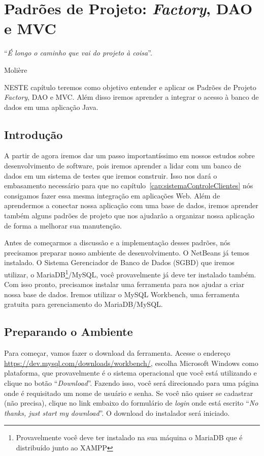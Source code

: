 \chapter{Padrões de Projeto: \textit{Factory}, DAO e MVC}\label{cap:padroesDeProjeto}
\epigraph{``\textit{É longo o caminho que vai do projeto à coisa}''.}{Molière}

\lettrine[lines=4, lhang=0.1, lraise=0, loversize=0.2, findent=0.1em]{\textcolor{corTema}{N}}{ESTE} capítulo teremos como objetivo entender e aplicar os Padrões de Projeto \textit{Factory}, DAO e MVC. Além disso iremos aprender a integrar o acesso à banco de dados em uma aplicação Java.


\section{Introdução}

A partir de agora iremos dar um passo importantíssimo em nossos estudos sobre desenvolvimento de software, pois iremos aprender a lidar com um banco de dados em um sistema de testes que iremos construir. Isso nos dará o embasamento necessário para que no capítulo~\ref{cap:sistemaControleClientes} nós consigamos fazer essa mesma integração em aplicações Web. Além de aprendermos a conectar nossa aplicação com uma base de dados, iremos aprender também alguns padrões de projeto que nos ajudarão a organizar nossa aplicação de forma a melhorar sua manutenção. 

Antes de começarmos a discussão e a implementação desses padrões, nós precisamos preparar nosso ambiente de desenvolvimento. O NetBeans já temos instalado. O Sistema Gerenciador de Banco de Dados (SGBD) que iremos utilizar, o MariaDB\footnote{Provavelmente você deve ter instalado na sua máquina o MariaDB que é distribuído junto ao XAMPP}/MySQL, você provavelmente já deve ter instalado também. Com isso pronto, precisamos instalar uma ferramenta para nos ajudar a criar nossa base de dados. Iremos utilizar o MySQL Workbench, uma ferramenta gratuita para gerenciamento do MariaDB/MySQL. 


\section{Preparando o Ambiente}\label{sec:preparandoAmbiente}

Para começar, vamos fazer o download da ferramenta. Acesse o endereço \url{https://dev.mysql.com/downloads/workbench/}, escolha Microsoft Windows como plataforma, que provavelmente é o sistema operacional que você está utilizando e clique no botão ``\textit{Download}''. Fazendo isso, você será direcionado para uma página onde é requisitado um nome de usuário e senha. Se você não quiser se cadastrar (não precisa), clique no link embaixo do formulário de \textit{login} onde está escrito ``\textit{No thanks, just start my download}''. O download do instalador será iniciado.


